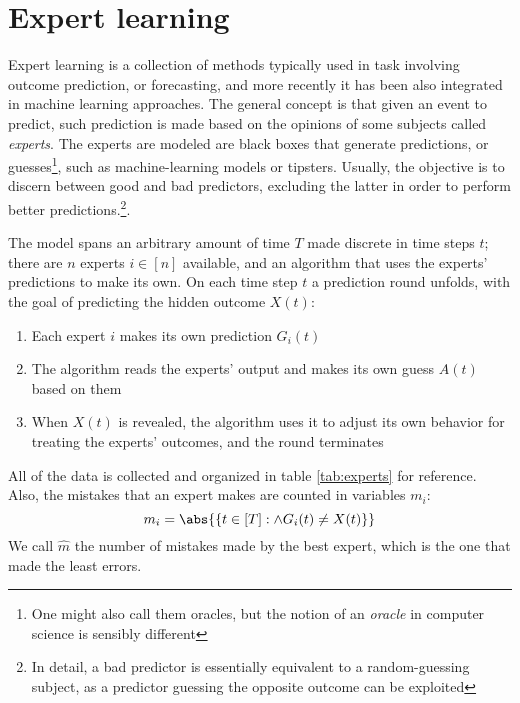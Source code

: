 \chapter{Expert learning}

Expert learning is a collection of methods typically used in task involving outcome prediction, or forecasting, and more recently it has been also integrated in machine learning approaches. The general concept is that given an event to predict, such prediction is made based on the opinions of some subjects called \emph{experts}. The experts are modeled are black boxes that generate predictions, or guesses\footnote{One might also call them oracles, but the notion of an \emph{oracle} in computer science is sensibly different}, such as machine-learning models or tipsters. Usually, the objective is to discern between good and bad predictors, excluding the latter in order to perform better predictions.\footnote{In detail, a bad predictor is essentially equivalent to a random-guessing subject, as a predictor guessing the opposite outcome can be exploited}.

The model spans an arbitrary amount of time $T$ made discrete in time steps $t$; there are $n$ experts $i \in [n]$ available, and an algorithm that uses the experts' predictions to make its own. On each time step $t$ a prediction round unfolds, with the goal of predicting the hidden outcome $X(t)$:

\begin{enumerate}
    \item Each expert $i$ makes its own prediction $G_i(t)$
    \item The algorithm reads the experts' output and makes its own guess $A(t)$ based on them
    \item When $X(t)$ is revealed, the algorithm uses it to adjust its own behavior for treating the experts' outcomes, and the round terminates
\end{enumerate}

All of the data is collected and organized in table \ref{tab:experts} for reference. Also, the mistakes that an expert makes are counted in variables $m_i$:
\[
    m_i = \abs{\{t \in [T] : \wedge G_i(t) \neq X(t)\}}
\]
We call $\widehat{m}$ the number of mistakes made by the best expert, which is the one that made the least errors.

